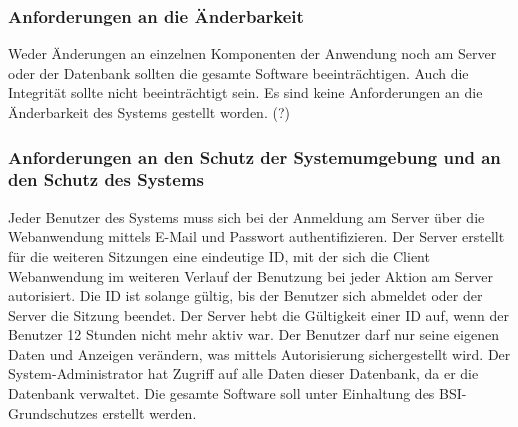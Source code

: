 \documentclass[a4paper,12pt,oneside]{scrartcl}
\begin{document}
\subsubsection{Anforderungen an die Änderbarkeit}
Weder Änderungen an einzelnen Komponenten der Anwendung noch am Server oder der Datenbank sollten die gesamte Software beeinträchtigen.
Auch die Integrität sollte nicht beeinträchtigt sein.
Es sind keine Anforderungen an die Änderbarkeit des Systems gestellt worden. (?)


\subsubsection{Anforderungen an den Schutz der Systemumgebung und an den Schutz des Systems}
Jeder Benutzer des Systems muss sich bei der Anmeldung am Server über die Webanwendung mittels E-Mail und Passwort authentifizieren.
Der Server erstellt für die weiteren Sitzungen eine eindeutige ID, mit der sich die Client Webanwendung im weiteren Verlauf der Benutzung bei jeder Aktion am Server autorisiert.
Die ID ist solange gültig, bis der Benutzer sich abmeldet oder der Server die Sitzung beendet.
Der Server hebt die Gültigkeit einer ID auf, wenn der Benutzer 12 Stunden nicht mehr aktiv war.
Der Benutzer darf nur seine eigenen Daten und Anzeigen verändern, was mittels Autorisierung sichergestellt wird.
Der System-Administrator hat Zugriff auf alle Daten dieser Datenbank, da er die Datenbank verwaltet. 
Die gesamte Software soll unter Einhaltung des BSI-Grundschutzes erstellt werden. 
\end{document}

